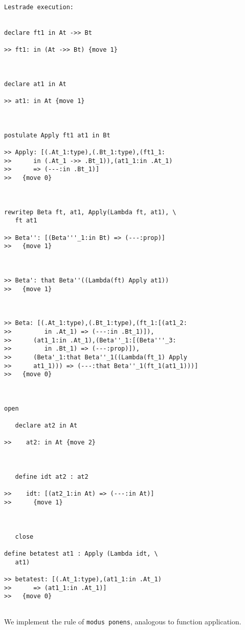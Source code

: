 \documentclass{article}
\begin{document}
\begin{verbatim}Lestrade execution:


declare ft1 in At ->> Bt

>> ft1: in (At ->> Bt) {move 1}



declare at1 in At

>> at1: in At {move 1}



postulate Apply ft1 at1 in Bt

>> Apply: [(.At_1:type),(.Bt_1:type),(ft1_1:
>>      in (.At_1 ->> .Bt_1)),(at1_1:in .At_1)
>>      => (---:in .Bt_1)]
>>   {move 0}



rewritep Beta ft, at1, Apply(Lambda ft, at1), \
   ft at1

>> Beta'': [(Beta'''_1:in Bt) => (---:prop)]
>>   {move 1}



>> Beta': that Beta''((Lambda(ft) Apply at1))
>>   {move 1}



>> Beta: [(.At_1:type),(.Bt_1:type),(ft_1:[(at1_2:
>>         in .At_1) => (---:in .Bt_1)]),
>>      (at1_1:in .At_1),(Beta''_1:[(Beta'''_3:
>>         in .Bt_1) => (---:prop)]),
>>      (Beta'_1:that Beta''_1((Lambda(ft_1) Apply
>>      at1_1))) => (---:that Beta''_1(ft_1(at1_1)))]
>>   {move 0}



open

   declare at2 in At

>>    at2: in At {move 2}



   define idt at2 : at2

>>    idt: [(at2_1:in At) => (---:in At)]
>>      {move 1}



   close

define betatest at1 : Apply (Lambda idt, \
   at1)

>> betatest: [(.At_1:type),(at1_1:in .At_1)
>>      => (at1_1:in .At_1)]
>>   {move 0}


\end{verbatim}

We implement the rule of {\tt modus ponens\/}, analogous to function application.
\end{document}
